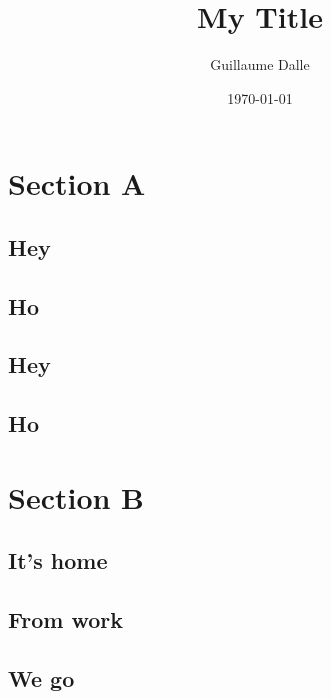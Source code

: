 \documentclass{article}
\title{My Title}
\author{Guillaume Dalle}
\date{\today}
\begin{document}
\maketitle

\section{Section A}

\subsection{Hey}

\subsection{Ho}

\subsection{Hey}

\subsection{Ho}

\section{Section B}

\subsection{It's home}

\subsection{From work}

\subsection{We go}
\end{document}
